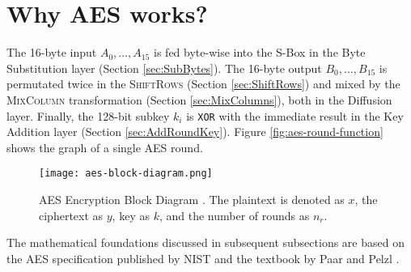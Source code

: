 \section{Why AES works?}
\label{sec:why}
\label{sec:math}

The 16-byte input $A_0, \dots, A_{15}$ is fed byte-wise into the S-Box in the Byte Substitution layer (Section \ref{sec:SubBytes}).
The 16-byte output $B_0, \dots, B_{15}$ is permutated twice in the \textsc{ShiftRows} (Section \ref{sec:ShiftRows}) and mixed by the \textsc{MixColumn} transformation (Section \ref{sec:MixColumns}), both in the Diffusion layer.
Finally, the 128-bit subkey $k_i$ is \texttt{XOR} with the immediate result in the Key Addition layer (Section \ref{sec:AddRoundKey}).
Figure \ref{fig:aes-round-function} shows the graph of a single AES round. 

\begin{figure}[!ht]
    \centering
    \texttt{[image: aes-block-diagram.png]}
    \caption{
        AES Encryption Block Diagram \cite{Paar2024}.
        The plaintext is denoted as $x$, the ciphertext as $y$, key as $k$, and the number of rounds as $n_r$.
    }
    \label{fig:aes-block-diagram}
\end{figure}

The mathematical foundations discussed in subsequent subsections are based on the \gls{AES} specification published by \gls{NIST} \cite{NIST_AES} and the textbook by Paar and Pelzl \cite{Paar2024}.








\newpage


